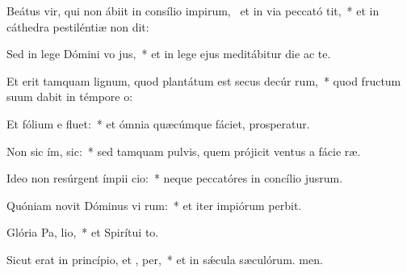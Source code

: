 \item Beátus vir, qui non ábiit in consílio impirum,~\pscross{} et in via peccató  tit,~* et in cáthedra pestiléntiæ non dit:
\item Sed in lege Dómini vo jus,~* et in lege ejus meditábitur die ac te.
\item Et erit tamquam lignum, quod plantátum est secus decúr rum,~* quod fructum suum dabit in témpore o:
\item Et fólium e  fluet:~* et ómnia quæcúmque fáciet, prosperatur.
\item Non sic ím,  sic:~* sed tamquam pulvis, quem prójicit ventus a fácie ræ.
\item Ideo non resúrgent ímpii  cio:~* neque peccatóres in concílio jusrum.
\item Quóniam novit Dóminus vi rum:~* et iter impiórum perbit.
\item Glória Pa,  lio,~* et Spirítui to.
\item Sicut erat in princípio, et ,  per,~* et in sǽcula sæculórum. men.
